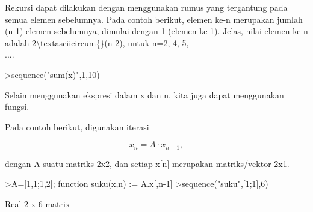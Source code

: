 \documentclass[12pt,arial,letterpaper]{book}
\begin{document}
\begin{eulernootebook}
\begin{eulercomment}
\begin{eulercomment}
\begin{eulernootebook}
\begin{eulercomment}
\begin{eulercomment}
\begin{eulercomment}
\begin{eulercomment}
\begin{eulercomment}
\begin{eulercomment}
\begin{eulernotebook}
\begin{eulercomment}
\begin{eulercomment}
\begin{eulercomment}
\begin{eulercomment}
\begin{eulercomment}
\begin{eulercomment}
\begin{eulercomment}
\begin{eulercomment}
\begin{eulercomment}
\begin{eulercomment}
\begin{eulercomment}
\begin{eulercomment}
\begin{eulercomment}
\begin{eulercomment}
\begin{eulercomment}
\begin{eulercomment}
\begin{eulercomment}
\begin{eulercomment}
\begin{eulercomment}
\begin{eulercomment}
\begin{eulercomment}
\begin{eulercomment}
\begin{eulercomment}
\begin{eulercomment}
\begin{eulercomment}
\begin{eulercomment}
\begin{eulercomment}
Rekursi dapat dilakukan dengan menggunakan rumus yang tergantung pada
semua elemen sebelumnya. Pada contoh berikut, elemen ke-n merupakan
jumlah (n-1) elemen sebelumnya, dimulai dengan 1 (elemen ke-1). Jelas,
nilai elemen ke-n adalah 2\textbackslash{}textasciicircum\{\}(n-2), untuk n=2, 4, 5,\\
....
\end{eulercomment}
\begin{eulerprompt}
>sequence("sum(x)",1,10)
\end{eulerprompt}
\begin{euleroutput}
  [1,  1,  2,  4,  8,  16,  32,  64,  128,  256]
\end{euleroutput}
\begin{eulercomment}
Selain menggunakan ekspresi dalam x dan n, kita juga dapat menggunakan
fungsi.

Pada contoh berikut, digunakan iterasi

\end{eulercomment}
\begin{eulerformula}
\[
x_n =A \cdot x_{n-1},
\]
\end{eulerformula}
\begin{eulercomment}
dengan A suatu matriks 2x2, dan setiap x[n] merupakan matriks/vektor
2x1.
\end{eulercomment}
\begin{eulerprompt}
>A=[1,1;1,2]; function suku(x,n) := A.x[,n-1]
>sequence("suku",[1;1],6)
\end{eulerprompt}
\begin{euleroutput}
  Real 2 x 6 matrix
  

\end{euleroutput}
\end{eulercomment}
\end{eulercomment}
\end{eulercomment}
\end{eulercomment}
\end{eulercomment}
\end{eulercomment}
\end{eulercomment}
\end{eulercomment}
\end{eulercomment}
\end{eulercomment}
\end{eulercomment}
\end{eulercomment}
\end{eulercomment}
\end{eulercomment}
\end{eulercomment}
\end{eulercomment}
\end{eulercomment}
\end{eulercomment}
\end{eulercomment}
\end{eulercomment}
\end{eulercomment}
\end{eulercomment}
\end{eulercomment}
\end{eulercomment}
\end{eulercomment}
\end{eulercomment}
\end{eulernotebook}
\end{eulercomment}
\end{eulercomment}
\end{eulercomment}
\end{eulercomment}
\end{eulercomment}
\end{eulercomment}
\end{eulernootebook}
\end{eulercomment}
\end{eulercomment}
\end{eulernootebook}
\end{document}
